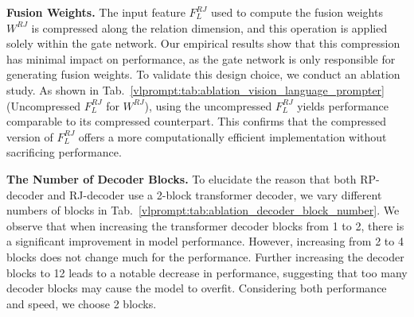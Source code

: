 \noindent \textbf{Fusion Weights.}
The input feature $F_L^{RJ}$ used to compute the fusion weights $W^{RJ}$ is compressed along the relation dimension, and this operation is applied solely within the gate network.
Our empirical results show that this compression has minimal impact on performance, as the gate network is only responsible for generating fusion weights.
To validate this design choice, we conduct an ablation study.
As shown in Tab.~\ref{vlprompt:tab:ablation_vision_language_prompter} (Uncompressed $F_L^{RJ}$ for $W^{RJ}$), using the uncompressed $F_L^{RJ}$ yields performance comparable to its compressed counterpart.
This confirms that the compressed version of $F_L^{RJ}$ offers a more computationally efficient implementation without sacrificing performance.



\begin{table}[!t]
    \centering
    \setlength{\tabcolsep}{2.8mm}
    \caption{Ablation study for the number of decoder blocks.}
    \label{vlprompt:tab:ablation_decoder_block_number}
\end{table}

\noindent \textbf{The Number of Decoder Blocks.}
To elucidate the reason that both RP-decoder and RJ-decoder use a 2-block transformer decoder, we vary different numbers of blocks in Tab.~\ref{vlprompt:tab:ablation_decoder_block_number}.
We observe that when increasing the transformer decoder blocks from 1 to 2, there is a significant improvement in model performance.
However, increasing from 2 to 4 blocks does not change much for the performance.
Further increasing the decoder blocks to 12 leads to a notable decrease in performance, suggesting that too many decoder blocks may cause the model to overfit.
Considering both performance and speed, we choose 2 blocks.


